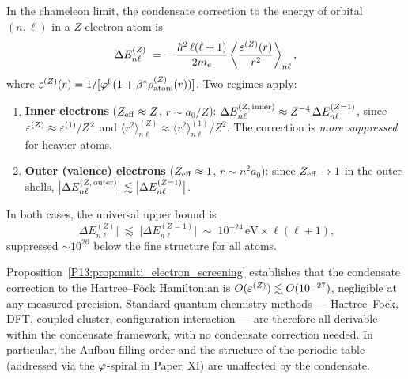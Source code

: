 \begin{proposition}
\label{P13:prop:multi_electron_energy}
In the chameleon limit, the condensate
correction to the energy of orbital $(n,\ell)$ in a $Z$-electron atom is
\begin{equation}
  \Delta E_{n\ell}^{(Z)}
  \;=\; -\frac{\hbar^2\,\ell(\ell+1)}{2m_e}
        \left\langle\frac{\varepsilon^{(Z)}(r)}{r^2}\right\rangle_{n\ell},
  \label{P13:eq:delta_E_Z}
\end{equation}
where $\varepsilon^{(Z)}(r)=1/[\varphi^6(1+\beta^{*}\rho_{\rm atom}^{(Z)}(r))]$.
Two regimes apply:
\begin{enumerate}[noitemsep,label=(\roman*)]
\item \textbf{Inner electrons} ($Z_{\rm eff}\approx Z$, $r\sim a_0/Z$):
  $\Delta E_{n\ell}^{(Z,\,\rm inner)}\approx Z^{-4}\,\Delta E_{n\ell}^{(Z=1)}$,
  since $\varepsilon^{(Z)}\approx\varepsilon^{(1)}/Z^2$ and
  $\langle r^2\rangle_{n\ell}^{(Z)}\approx\langle r^2\rangle_{n\ell}^{(1)}/Z^2$.
  The correction is \emph{more suppressed} for heavier atoms.
\item \textbf{Outer (valence) electrons} ($Z_{\rm eff}\approx 1$, $r\sim n^2 a_0$):
  since $Z_{\rm eff}\to1$ in the outer shells,
  $\bigl|\Delta E_{n\ell}^{(Z,\,\rm outer)}\bigr|\lesssim\bigl|\Delta E_{n\ell}^{(Z=1)}\bigr|$.
\end{enumerate}
In both cases, the universal upper bound is
\begin{equation}
  \bigl|\Delta E_{n\ell}^{(Z)}\bigr|
  \;\lesssim\; \bigl|\Delta E_{n\ell}^{(Z=1)}\bigr|
  \;\sim\; 10^{-24}\,\mathrm{eV}\times\ell(\ell+1),
  \label{P13:eq:delta_E_bound}
\end{equation}
suppressed $\sim10^{20}$ below the fine structure for all atoms.
\end{proposition}

\begin{corollary}
\label{P13:cor:HF_exact}
Proposition~\ref{P13:prop:multi_electron_screening} establishes that the
condensate correction to the Hartree--Fock Hamiltonian is
$O(\varepsilon^{(Z)})\lesssim O(10^{-27})$, negligible at any measured precision.
Standard quantum chemistry methods --- Hartree--Fock, DFT, coupled cluster,
configuration interaction --- are therefore all derivable within the
condensate framework, with no condensate correction needed.
In particular, the Aufbau filling order and the structure of the
periodic table (addressed via the $\varphi$-spiral in Paper~XI)
are unaffected by the condensate.
\end{corollary}


